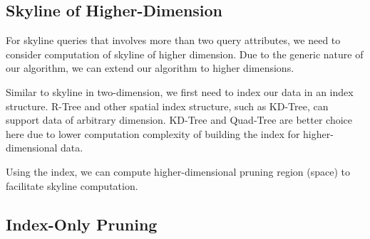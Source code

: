 \documentclass{sig-alternate}
\begin{document}

\subsection{Skyline of Higher-Dimension}
For skyline queries that involves more than two query attributes, we need to consider computation of
skyline of higher dimension. Due to the generic nature of our algorithm, we can extend our algorithm
to higher dimensions.

Similar to skyline in two-dimension, we first need to index our data in an index structure. R-Tree and other
spatial index structure, such as KD-Tree, can support data of arbitrary dimension. KD-Tree and
Quad-Tree are better choice here due to lower computation complexity of building the index for
higher-dimensional data. %


Using the index, we can compute higher-dimensional pruning region (space) to facilitate skyline
computation.


\subsection{Index-Only Pruning}
\end{document}

